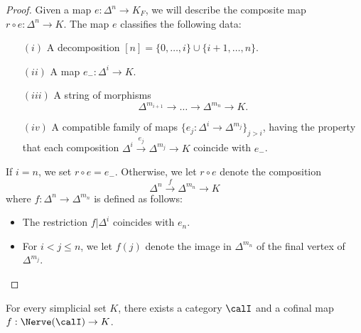 \begin{proof}
Given a map $e: \Delta^n \rightarrow K_{F}$, we will describe the
composite map $r \circ e: \Delta^n \rightarrow K$. The map $e$ classifies the following data:
\begin{itemize}
\item[$(i)$] A decomposition $[n] = \{0, \ldots, i\} \cup \{i+1, \ldots, n \}$. 
\item[$(ii)$] A map $e_{-}: \Delta^{i} \rightarrow K$.
\item[$(iii)$] A string of morphisms
$$ \Delta^{ m_{i+1} } \rightarrow \ldots \rightarrow \Delta^{ m_n } \rightarrow K.$$
\item[$(iv)$] A compatible family of maps
$\{ e_j: \Delta^{i} \rightarrow \Delta^{m_j} \}_{ j > i }$, having the property that each composition $\Delta^i \stackrel{e_j}{\rightarrow} \Delta^{m_j} \rightarrow K$
coincide with $e_{-}$.
\end{itemize}

If $i = n$, we set $r \circ e = e_{-}$. Otherwise, we let $r \circ e$ denote the composition
$$ \Delta^n \stackrel{f}{\rightarrow} \Delta^{m_n} \rightarrow K$$
where $f: \Delta^n \rightarrow \Delta^{m_n}$ is defined as follows:

\begin{itemize}
\item The restriction $f | \Delta^{i}$ coincides with $e_n$.

\item For $i < j \leq n$, we let $f(j)$ denote the image in
$\Delta^{m_n}$ of the final vertex of $\Delta^{m_j}$.
\end{itemize}
\end{proof}

\begin{proposition}\label{cofinalcategories}
For every simplicial set $K$, there exists a category
$\calI$ and a cofinal map $f: \Nerve(\calI) \rightarrow K$.
\end{proposition}

